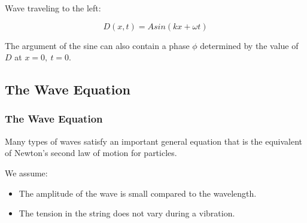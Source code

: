 \documentclass[]{beamer}
\begin{document}
\begin{frame}


Wave traveling to the left:

\pause

\begin{equation}
D(x,t)=Asin(kx+\omega t)
\end{equation}

\pause

The argument of the sine can also contain a phase $\phi$ determined by the value of $D$ at $x=0,~t=0$.
  \end{frame}


\subsection{The Wave Equation}

\begin{frame}


\frametitle{The Wave Equation}






Many types of waves satisfy an important general equation that is the equivalent
of Newton’s second law of motion for particles.

\pause

We assume:

\pause

\begin{itemize}
\item The amplitude of the wave is small compared to the wavelength.

\pause
\item The tension in the string does not vary during a vibration.
\end{itemize}


  \end{frame}




\end{document}
